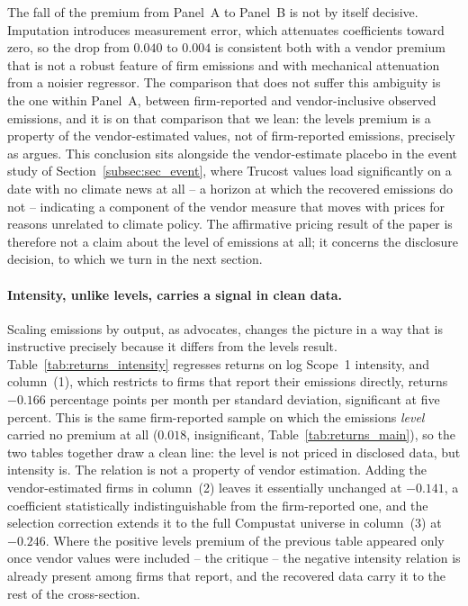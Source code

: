 \documentclass[a4paper,12pt]{article}
\newcommand{\citet}[1]{\textcite{#1}}
\begin{document}
The fall of the premium from Panel~A to Panel~B is not by itself decisive. Imputation introduces measurement error, which attenuates coefficients toward zero, so the drop from $0.040$ to $0.004$ is consistent both with a vendor premium that is not a robust feature of firm emissions and with mechanical attenuation from a noisier regressor. The comparison
that does not suffer this ambiguity is the one within Panel~A, between firm-reported and vendor-inclusive observed emissions, and it is on that comparison that we lean: the levels premium is a property of the vendor-estimated values, not of firm-reported
emissions, precisely as \citet{aswani2024carbon} argues. This conclusion sits alongside the vendor-estimate placebo in the event study of Section~\ref{subsec:sec_event}, where Trucost values load significantly on a date with no climate news at all -- a horizon at which the recovered emissions do not -- indicating a component of the vendor measure that moves with prices for reasons unrelated to climate policy. The affirmative pricing result of the paper is therefore not a claim about the level of
emissions at all; it concerns the disclosure decision, to which we turn in the next section.

\paragraph{Intensity, unlike levels, carries a signal in clean data.}
Scaling emissions by output, as \citet{aswani2024carbon} advocates, changes the
picture in a way that is instructive precisely because it differs from the levels result. Table~\ref{tab:returns_intensity} regresses returns on log Scope~1 intensity, and column~(1), which restricts to firms that report their emissions directly, returns $-0.166$ percentage points per month per standard deviation, significant at five
percent. This is the same firm-reported sample on which the emissions \emph{level} carried no premium at all ($0.018$, insignificant, Table~\ref{tab:returns_main}), so the two tables together draw a clean line: the level is not priced in disclosed data, but intensity is. The relation is not a property of vendor estimation. Adding the vendor-estimated firms in column~(2) leaves it essentially unchanged at $-0.141$, a coefficient statistically indistinguishable from the firm-reported one, and the selection correction extends it to the full Compustat universe in column~(3) at $-0.246$. Where the positive levels premium of the previous table appeared only once vendor values were included -- the \citet{aswani2024carbon} critique -- the negative
intensity relation is already present among firms that report, and the recovered data carry it to the rest of the cross-section.
\end{document}
